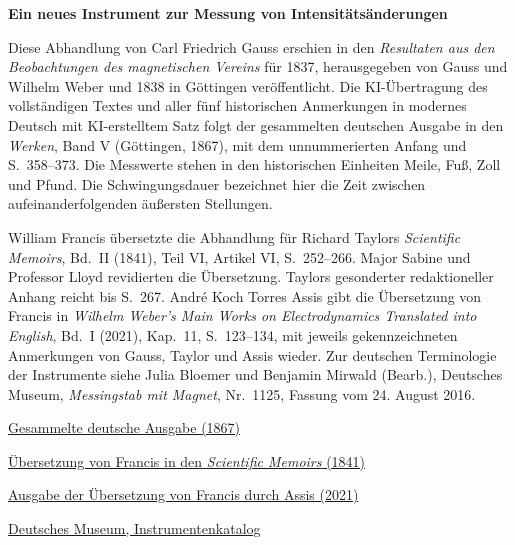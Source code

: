 \clearpage
\thispagestyle{empty}
\begin{center}\Large\textbf{Ein neues Instrument zur Messung von Intensitätsänderungen}\end{center}

Diese Abhandlung von Carl Friedrich Gauss erschien in den \textit{Resultaten aus den Beobachtungen des magnetischen Vereins} für 1837, herausgegeben von Gauss und Wilhelm Weber und 1838 in Göttingen veröffentlicht. Die KI-Übertragung des vollständigen Textes und aller fünf historischen Anmerkungen in modernes Deutsch mit KI-erstelltem Satz folgt der gesammelten deutschen Ausgabe in den \textit{Werken}, Band V (Göttingen, 1867), mit dem unnummerierten Anfang und S.~358--373. Die Messwerte stehen in den historischen Einheiten Meile, Fuß, Zoll und Pfund. Die Schwingungsdauer bezeichnet hier die Zeit zwischen aufeinanderfolgenden äußersten Stellungen.

\medskip\noindent
William Francis übersetzte die Abhandlung für Richard Taylors \textit{Scientific Memoirs}, Bd.~II (1841), Teil VI, Artikel VI, S.~252--266. Major Sabine und Professor Lloyd revidierten die Übersetzung. Taylors gesonderter redaktioneller Anhang reicht bis S.~267. André Koch Torres Assis gibt die Übersetzung von Francis in \textit{Wilhelm Weber's Main Works on Electrodynamics Translated into English}, Bd.~I (2021), Kap.~11, S.~123--134, mit jeweils gekennzeichneten Anmerkungen von Gauss, Taylor und Assis wieder. Zur deutschen Terminologie der Instrumente siehe Julia Bloemer und Benjamin Mirwald (Bearb.), Deutsches Museum, \textit{Messingstab mit Magnet}, Nr.~1125, Fassung vom 24. August 2016.

\medskip\noindent
\href{https://gdz.sub.uni-goettingen.de/id/PPN236006339}{Gesammelte deutsche Ausgabe (1867)}\par
\noindent\href{https://archive.org/details/s1id11857360}{Übersetzung von Francis in den \textit{Scientific Memoirs} (1841)}\par
\noindent\href{https://www.ifi.unicamp.br/~assis/Weber-in-English-Vol-1.pdf\#page=126}{Ausgabe der Übersetzung von Francis durch Assis (2021)}\par
\noindent\href{https://digital.deutsches-museum.de/projekte/gruendungssammlung/detail/1125/}{Deutsches Museum, Instrumentenkatalog}
\clearpage
